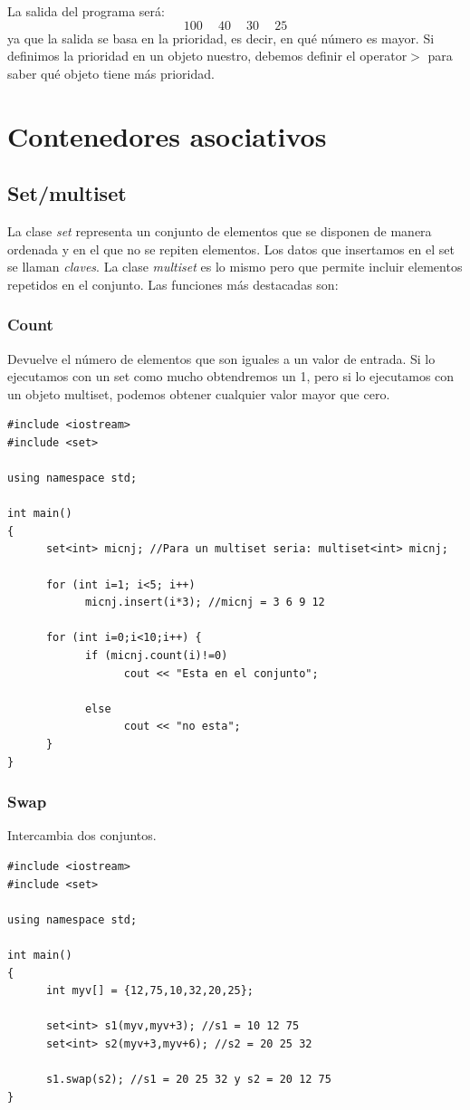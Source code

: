 \documentclass[10pt,a4paper,spanish]{report}
\begin{document}
\noindent
La salida del programa será:
\begin{displaymath}
100 \quad\ 40 \quad\ 30 \quad\ 25
\end{displaymath}
ya que la salida se basa en la prioridad, es decir, en qué número es mayor. Si definimos la prioridad en un objeto nuestro, debemos definir el operator$>$ para saber qué objeto tiene más prioridad.

\section{\textcolor[rgb]{0.2,0.5,0.5}Contenedores asociativos}
\subsection{\textcolor[rgb]{0.2,0.5,0.5}Set/multiset}
\noindent
La clase \textit{\textcolor[rgb]{0.2,0.5,0.5}{set}} representa un conjunto de elementos que se disponen de manera ordenada y en el que no se repiten elementos. Los datos que insertamos en el set se llaman \textit{\textcolor[rgb]{0.2,0.5,0.5}{claves}}. La clase \textit{\textcolor[rgb]{0.2,0.5,0.5}{multiset}} es lo mismo pero que permite incluir elementos repetidos en el conjunto. Las funciones más destacadas son:

\subsubsection{\textcolor[rgb]{0.2,0.5,0.5}Count}
\noindent
Devuelve el número de elementos que son iguales a un valor de entrada. Si lo ejecutamos con un set como mucho obtendremos un 1, pero si lo ejecutamos con un objeto multiset, podemos obtener cualquier valor mayor que cero.
\begin{verbatim}
#include <iostream>
#include <set>

using namespace std;

int main()
{
      set<int> micnj; //Para un multiset seria: multiset<int> micnj;

      for (int i=1; i<5; i++)
            micnj.insert(i*3); //micnj = 3 6 9 12

      for (int i=0;i<10;i++) {
            if (micnj.count(i)!=0)
                  cout << "Esta en el conjunto";

            else
                  cout << "no esta";
      }
}
\end{verbatim}

\subsubsection{\textcolor[rgb]{0.2,0.5,0.5}Swap}
\noindent
Intercambia dos conjuntos.
\begin{verbatim}
#include <iostream>
#include <set>

using namespace std;

int main()
{
      int myv[] = {12,75,10,32,20,25};

      set<int> s1(myv,myv+3); //s1 = 10 12 75
      set<int> s2(myv+3,myv+6); //s2 = 20 25 32

      s1.swap(s2); //s1 = 20 25 32 y s2 = 20 12 75
}
\end{verbatim}
\end{document}
